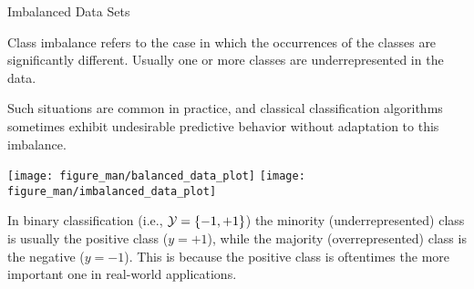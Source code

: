 \begin{vbframe}{Imbalanced Data Sets}
%
\small{
  \begin{itemize}
%  	
	\begin{minipage}{0.45\textwidth}
%		    
		    \item Class imbalance refers to the case in which the occurrences of the classes are significantly different. Usually one or more classes are underrepresented in the data.
%		     
		    \item Such situations are common in practice, and classical classification algorithms sometimes exhibit undesirable predictive behavior without adaptation to this imbalance.
	\end{minipage}
	\begin{minipage}{0.45\textwidth}    
		\begin{center}
			\texttt{[image: figure\_man/balanced\_data\_plot]}
			\texttt{[image: figure\_man/imbalanced\_data\_plot]}
		\end{center}
	\end{minipage}

%	
	\item In binary classification (i.e., $\mathcal{Y} =\{-1,+1\}$) the minority (underrepresented) class is usually the positive class ($y=+1$), while the majority (overrepresented) class is the negative ($y=-1$). This is because the positive class is oftentimes the more important one in real-world applications.
%

  \end{itemize}}
%
\end{vbframe}

